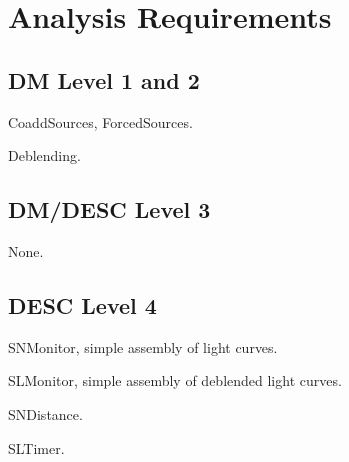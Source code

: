 \section{Analysis Requirements}
\def\secname{\chpname:analysis}
\label{\secname}



\subsection{DM Level 1 and 2}

CoaddSources, ForcedSources.

Deblending.


\subsection{DM/DESC Level 3}

None.


\subsection{DESC Level 4}

SNMonitor, simple assembly of light curves.

SLMonitor, simple assembly of deblended light curves.

SNDistance.

SLTimer.

